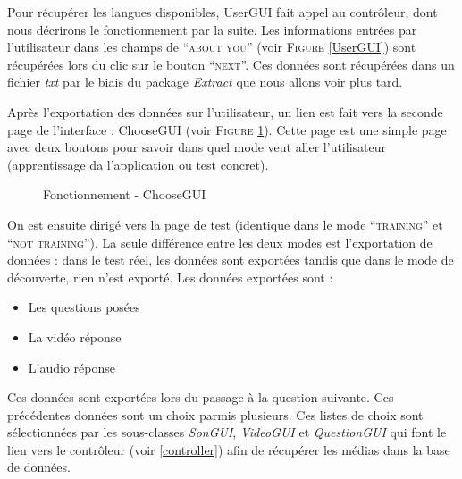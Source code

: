 Pour récupérer les langues disponibles, UserGUI fait appel au contrôleur, dont nous décrirons le fonctionnement par la suite.
Les informations entrées par l'utilisateur dans les champs de ``\textsc{about you}'' (voir \textsc{Figure} \ref{UserGUI}) sont récupérées lors du clic sur le bouton ``\textsc{next}''. Ces données sont récupérées dans un fichier \textit{txt} par le biais du package \textit{Extract} que nous allons voir plus tard.

Après l'exportation des données sur l'utilisateur, un lien est fait vers la seconde page de l'interface : ChooseGUI (voir \textsc{Figure} \ref{ChooseGUI}). Cette page est une simple page avec deux boutons pour savoir dans quel mode veut aller l'utilisateur (apprentissage da l'application ou test concret).


\begin{figure}[!ht]
\begin{center}
  \caption{Fonctionnement - ChooseGUI}
  \label{ChooseGUI} 
\end{center}
\end{figure}

On est ensuite dirigé vers la page de test (identique dans le mode ``\textsc{training}'' et ``\textsc{not training}''). La seule différence entre les deux modes est l'exportation de données : dans le test réel, les données sont exportées tandis que dans le mode de découverte, rien n'est exporté.
Les données exportées sont :
\begin{itemize}
 \item Les questions posées
 \item La vidéo réponse
 \item L'audio réponse
\end{itemize}
Ces données sont exportées lors du passage à la question suivante.
Ces précédentes données sont un choix parmis plusieurs. Ces listes de choix sont sélectionnées par les sous-classes \textit{SonGUI}, \textit{VideoGUI} et \textit{QuestionGUI} qui font le lien vers le contrôleur (voir \ref{controller}) afin de récupérer les médias dans la base de données.


